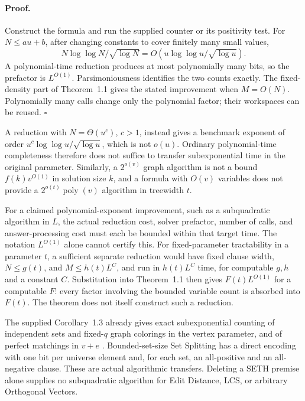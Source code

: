 \paragraph{Proof.}
Construct the formula and run the supplied counter or its positivity
test. For \(N\leq au+b\), after changing constants to cover finitely
many small values,
\[
 N\log\log N/\sqrt{\log N}
 =O(u\log\log u/\sqrt{\log u}).
\]
A polynomial-time reduction produces at most polynomially many bits,
so the prefactor is \(L^{O(1)}\).
Parsimoniousness identifies the two counts exactly.
The fixed-density part of Theorem~1.1 gives the stated improvement
when \(M=O(N)\).
Polynomially many calls change only the polynomial factor; their
workspaces can be reused.
\hfill\(\square\)

A reduction with \(N=\Theta(u^c)\), \(c>1\), instead gives a benchmark
exponent of order \(u^c\log\log u/\sqrt{\log u}\), which is not \(o(u)\).
Ordinary polynomial-time completeness therefore does not suffice to
transfer subexponential time in the original parameter.
Similarly, a \(2^{o(v)}\) graph algorithm is not a bound
\(f(k)v^{O(1)}\) in solution size \(k\), and a formula with \(O(v)\)
variables does not provide a \(2^{o(t)}\operatorname{poly}(v)\)
algorithm in treewidth \(t\).

For a claimed polynomial-exponent improvement, such as a
subquadratic algorithm in \(L\), the actual reduction cost,
solver prefactor, number of calls, and answer-processing cost must
each be bounded within that target time.
The notation \(L^{O(1)}\) alone cannot certify this.
For fixed-parameter tractability in a parameter \(t\), a sufficient
separate reduction would have fixed clause width,
\(N\leq g(t)\), and \(M\leq h(t)L^C\), and run in
\(h(t)L^C\) time, for computable \(g,h\) and a constant \(C\).
Substitution into Theorem~1.1 then gives
\(F(t)L^{O(1)}\) for a computable \(F\): every factor involving
the bounded variable count is absorbed into \(F(t)\).
The theorem does not itself construct such a reduction.

The supplied Corollary~1.3 already gives exact subexponential counting
of independent sets and fixed-\(q\) graph colorings in the vertex
parameter, and of perfect matchings in \(v+e\)
\cite[Corollary~1.3]{OpenAIETH}.
Bounded-set-size Set Splitting has a direct encoding with one bit per
universe element and, for each set, an all-positive and an all-negative
clause. These are actual algorithmic transfers.
Deleting a SETH premise alone supplies no subquadratic algorithm for
Edit Distance, LCS, or arbitrary Orthogonal Vectors.

